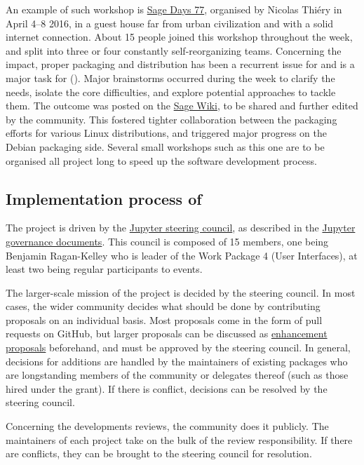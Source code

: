 \documentclass{deliverablereport}
\begin{document}
An example of such workshop is
\href{https://wiki.sagemath.org/days77/}{Sage Days 77}, organised by
Nicolas Thiéry in April 4--8 2016, in a guest house far from urban
civilization and with a solid internet connection. About 15 people
joined this workshop throughout the week, and split into three or four
constantly self-reorganizing teams. Concerning the impact, proper
packaging and distribution has been a recurrent issue for \Sage and is
a major task for \ODK
(). Major
brainstorms occurred during the week to clarify the needs, isolate the
core difficulties, and explore potential approaches to tackle
them. The outcome was posted on the
\href{https://wiki.sagemath.org/days77/packaging}{Sage Wiki}, to be
shared and further edited by the community. This fostered tighter
collaboration between the packaging efforts for various Linux
distributions, and triggered major progress on the Debian packaging
side. Several small workshops such as this one are to be organised all
project long to speed up the software development process.


\subsection{Implementation process of \Jupyter}

The \Jupyter project is driven by the \href{https://jupyter.org/about.html}{Jupyter steering council}, as described in the \href{https://github.com/jupyter/governance}{Jupyter governance documents}. This council is composed of 15 members, one being Benjamin Ragan-Kelley who is leader of the Work Package 4 (User Interfaces),  at least two being regular participants to \ODK events.

The larger-scale mission of the project is decided by the steering council. In most cases, the wider \Jupyter community decides what should be done by contributing proposals on an individual basis. Most proposals come in the form of pull requests on GitHub, but larger proposals can be discussed as \href{https://github.com/jupyter/enhancement-proposals}{enhancement proposals} beforehand, and must be approved by the steering council. In general, decisions for additions are handled by the maintainers of existing packages who are longstanding members of the community or delegates thereof (such as those hired under the \ODK grant). If there is conflict, decisions can be resolved by the steering council.

Concerning the developments reviews, the \Jupyter community does it publicly. The maintainers of each project take on the bulk of the review responsibility. If there are conflicts, they can be brought to the steering council for resolution.
\end{document}
